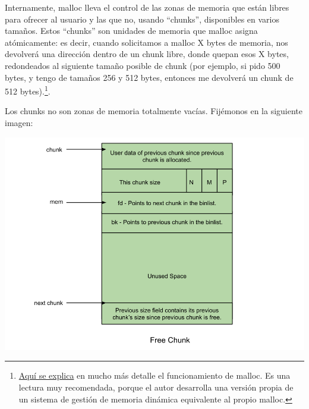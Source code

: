 \documentclass[a4paper]{article}
\begin{document}
Internamente, {\ttfamily malloc} lleva el control de las zonas de memoria que están libres para ofrecer al usuario y las que no, usando ``chunks'', disponibles en varios tamaños. Estos ``chunks'' son unidades de memoria que {\ttfamily malloc} asigna atómicamente: es decir, cuando solicitamos a {\ttfamily malloc} X bytes de memoria, nos devolverá una dirección dentro de un chunk libre, donde quepan esos X bytes, redondeados al siguiente tamaño posible de chunk (por ejemplo, si pido 500 bytes, y tengo de tamaños 256 y 512 bytes, entonces me devolverá un chunk de 512 bytes).\footnote{\href{https://danluu.com/malloc-tutorial/}{Aquí se explica} en mucho más detalle el funcionamiento de {\ttfamily malloc}. Es una lectura muy recomendada, porque el autor desarrolla una versión propia de un sistema de gestión de memoria dinámica equivalente al propio {\ttfamily malloc}.}.

Los chunks no son zonas de memoria totalmente vacías. Fijémonos en la siguiente imagen:
\begin{center}
\includegraphics[scale=0.30]{Free_chunk.png}
\end{center}
\end{document}
